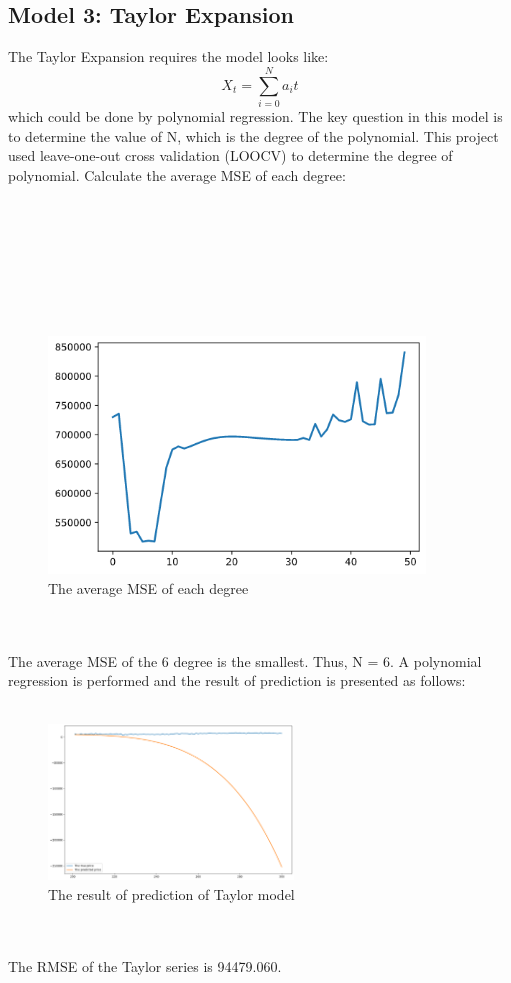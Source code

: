 \documentclass{article}
\begin{document}
\subsection{Model 3: Taylor Expansion}
The Taylor Expansion requires the model looks like:
\begin{equation}
	X_{t} = \sum_{i=0}^{N}a_{i}t
\end{equation}
which could be done by polynomial regression. The key question in this model is to determine the value of N, which is the degree of the polynomial.
This project used leave-one-out cross validation (LOOCV) to determine the degree of polynomial.
Calculate the average MSE of each degree:
\\
\\
\\
\\
\\
\\
\\
\\
\begin{figure}[htbp]\centering
	\includegraphics[width=10cm]{CV_AVG.png}
	\caption{The average MSE of each degree}
	\label{fig: Taylor}
\end{figure}
\\
\\
The average MSE of the 6 degree is the smallest. Thus, N = 6. A polynomial regression is performed and the result of prediction is presented as follows:
\\
\\
\begin{figure}[htbp]\centering
	\includegraphics[width=6.5cm]{Taylor_res.png}
	\caption{The result of prediction of Taylor model}
	\label{fig: Taylor}
\end{figure}
\\
\\
The RMSE of the Taylor series is 94479.060.
\end{document}
